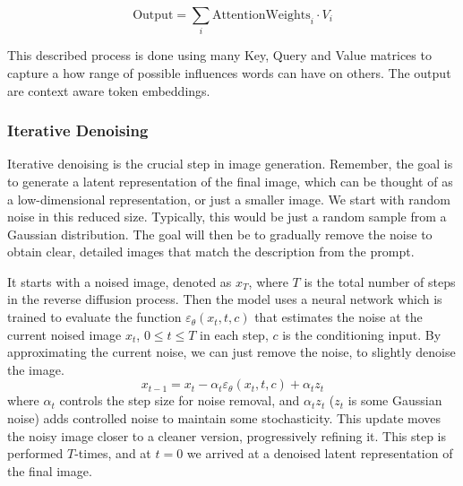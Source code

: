 \documentclass[11pt]{article}
\begin{document}
    $$\mathrm{Output} = \sum_i \mathrm{Attention Weights}_i \cdot V_i$$

    This described process is done using many Key, Query and Value matrices to capture a how range of possible influences words can have on others. The output are context aware token embeddings.
\fi

\subsubsection{Iterative Denoising}
Iterative denoising is the crucial step in image generation. Remember, the goal is to generate a latent representation of the final image, which can be thought of as a low-dimensional representation, or just a smaller image. We start with random noise in this reduced size. Typically, this would be just a random sample from a Gaussian distribution. The goal will then be to gradually remove the noise to obtain clear, detailed images that match the description from the prompt.

It starts with a noised image, denoted as $x_T$, where $T$ is the total number of steps in the reverse diffusion process. Then the model uses a neural network which is trained to evaluate the function $\varepsilon_\theta(x_t,t,c)$ that estimates the noise at the current noised image $x_t$, $0 \leq t \leq T$ in each step, $c$ is the conditioning input. By approximating the current noise, we can just remove the noise, to slightly denoise the image.
$$x_{t-1}=x_t-\alpha_t \varepsilon_\theta(x_t,t,c)+ \alpha_t z_t$$
where $\alpha_t$ controls the step size for noise removal, and $\alpha_t z_t$  ($z_t$ is some Gaussian noise) adds controlled noise to maintain some stochasticity. This update moves the noisy image closer to a cleaner version, progressively refining it. This step is performed $T$-times, and at $t=0$ we arrived at a denoised latent representation of the final image.
\end{document}
